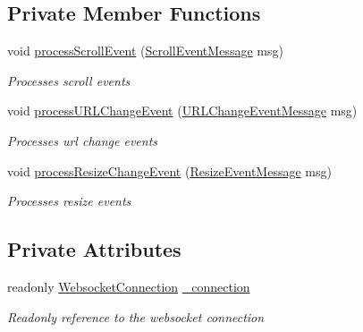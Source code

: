 \subsection*{Private Member Functions}
\begin{DoxyCompactItemize}
\item 
void \hyperlink{class_web_analyzer_1_1_server_1_1_message_handler_1_1_event_message_handler_abae5e602e947dc9b53479678117d5bed}{process\+Scroll\+Event} (\hyperlink{class_web_analyzer_1_1_models_1_1_message_model_1_1_in_1_1_event_messages_1_1_scroll_event_message}{Scroll\+Event\+Message} msg)
\begin{DoxyCompactList}\small\item\em Processes scroll events \end{DoxyCompactList}\item 
void \hyperlink{class_web_analyzer_1_1_server_1_1_message_handler_1_1_event_message_handler_a30a228c7b5ac5fa51f2b9f81fdd8908c}{process\+U\+R\+L\+Change\+Event} (\hyperlink{class_web_analyzer_1_1_models_1_1_message_model_1_1_in_1_1_event_messages_1_1_u_r_l_change_event_message}{U\+R\+L\+Change\+Event\+Message} msg)
\begin{DoxyCompactList}\small\item\em Processes url change events \end{DoxyCompactList}\item 
void \hyperlink{class_web_analyzer_1_1_server_1_1_message_handler_1_1_event_message_handler_aae85692e0e424caf7a57f28c103c1f3f}{process\+Resize\+Change\+Event} (\hyperlink{class_web_analyzer_1_1_models_1_1_message_model_1_1_in_1_1_event_messages_1_1_resize_event_message}{Resize\+Event\+Message} msg)
\begin{DoxyCompactList}\small\item\em Processes resize events \end{DoxyCompactList}\end{DoxyCompactItemize}
\subsection*{Private Attributes}
\begin{DoxyCompactItemize}
\item 
readonly \hyperlink{class_web_analyzer_1_1_server_1_1_websocket_connection}{Websocket\+Connection} \hyperlink{class_web_analyzer_1_1_server_1_1_message_handler_1_1_event_message_handler_ab818f2be9cb81fd8854221cc1906d736}{\+\_\+connection}
\begin{DoxyCompactList}\small\item\em Readonly reference to the websocket connection \end{DoxyCompactList}\end{DoxyCompactItemize}


